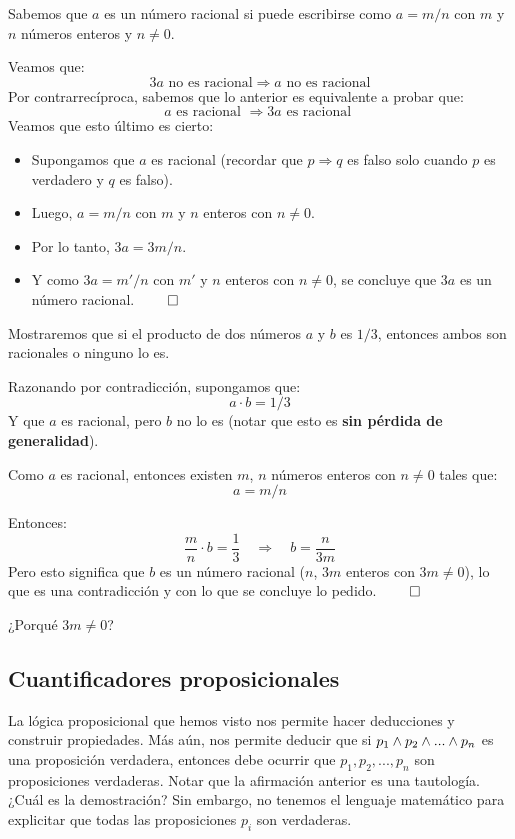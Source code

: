\begin{ejemplo}
	Sabemos que $a$ es un número racional si puede escribirse como $a = m/n$ con $m$ y $n$ números enteros y $n \neq 0$. 
	
	Veamos que: 
	$$ 3a \text{ no es racional} \Rightarrow a \text{ no es racional} $$
	Por contrarrecíproca, sabemos que lo anterior es equivalente a probar que: 
	$$ a \text{ es racional } \Rightarrow 3a \text{ es racional } $$ 
	Veamos que esto último es cierto: 
	\begin{itemize}
		\item Supongamos que $a$ es racional (recordar que $p \Rightarrow q$ es falso solo cuando $p$ es verdadero y $q$ es falso).
		\item Luego, $a = m/n$ con $m$ y $n$ enteros con $n\neq 0$.
		\item Por lo tanto, $3 a = 3m /n$.
		\item Y como $3a = m'/n$ con $m'$ y $n$ enteros con $n \neq 0$, se concluye que $3a$ es un número racional. $\qed$ 
	\end{itemize}
\end{ejemplo}

\begin{ejemplo}
	Mostraremos que si el producto de dos números $a$ y $b$ es $1/3$, entonces ambos son racionales o ninguno lo es. 
	
	Razonando por contradicción, supongamos que: 
	$$ a \cdot b = 1 /3 $$ 
	Y que $a$ es racional, pero $b$ no lo es (notar que esto es \textbf{sin pérdida de generalidad}).
	
	Como $a$ es racional, entonces existen $m$, $n$ números enteros con $n \neq 0$ tales que: 
	$$ a = m / n $$ 
	
	Entonces: 
	$$ \frac{m}{n} \cdot b = \frac{1}{3} \quad \Rightarrow \quad b = \frac{n}{3m} $$ 
	Pero esto significa que $b$ es un número racional ($n$, $3m$ enteros con $3m\neq 0$), lo que es una contradicción y con lo que se concluye lo pedido. $\qed$ 
	
	¿Porqué $3 m \neq 0$? 
\end{ejemplo}

\subsection{Cuantificadores proposicionales}

La lógica proposicional que hemos visto nos permite hacer deducciones y construir propiedades. Más aún, nos permite deducir que si $p_1 \wedge p_2 \wedge ... \wedge p_n$ es una proposición verdadera, entonces debe ocurrir que $p_1, p_2, ... , p_n$ son proposiciones verdaderas. Notar que la afirmación anterior es una tautología. ¿Cuál es la demostración? Sin embargo, no tenemos el lenguaje matemático para explicitar que todas las proposiciones $p_i$ son verdaderas. 

